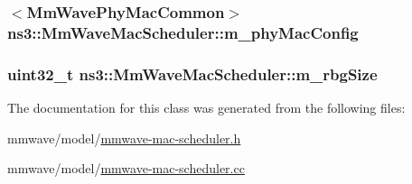 \subsubsection[{\texorpdfstring{m\+\_\+phy\+Mac\+Config}{m_phyMacConfig}}]{$<${\bf Mm\+Wave\+Phy\+Mac\+Common}$>$ ns3\+::\+Mm\+Wave\+Mac\+Scheduler\+::m\+\_\+phy\+Mac\+Config\hspace{0.3cm}{\ttfamily [protected]}}\hypertarget{classns3_1_1MmWaveMacScheduler_a24d7af4971d2e500fe543cefbafa2fd9}{}\label{classns3_1_1MmWaveMacScheduler_a24d7af4971d2e500fe543cefbafa2fd9}
\subsubsection[{\texorpdfstring{m\+\_\+rbg\+Size}{m_rbgSize}}]{\setlength{\rightskip}{0pt plus 5cm}uint32\+\_\+t ns3\+::\+Mm\+Wave\+Mac\+Scheduler\+::m\+\_\+rbg\+Size\hspace{0.3cm}{\ttfamily [protected]}}\hypertarget{classns3_1_1MmWaveMacScheduler_a3ffe6d6c1a07ef5c6c6c9fc6de6d7e6f}{}\label{classns3_1_1MmWaveMacScheduler_a3ffe6d6c1a07ef5c6c6c9fc6de6d7e6f}


The documentation for this class was generated from the following files\+:\begin{DoxyCompactItemize}
\item 
mmwave/model/\hyperlink{mmwave-mac-scheduler_8h}{mmwave-\/mac-\/scheduler.\+h}\item 
mmwave/model/\hyperlink{mmwave-mac-scheduler_8cc}{mmwave-\/mac-\/scheduler.\+cc}\end{DoxyCompactItemize}
